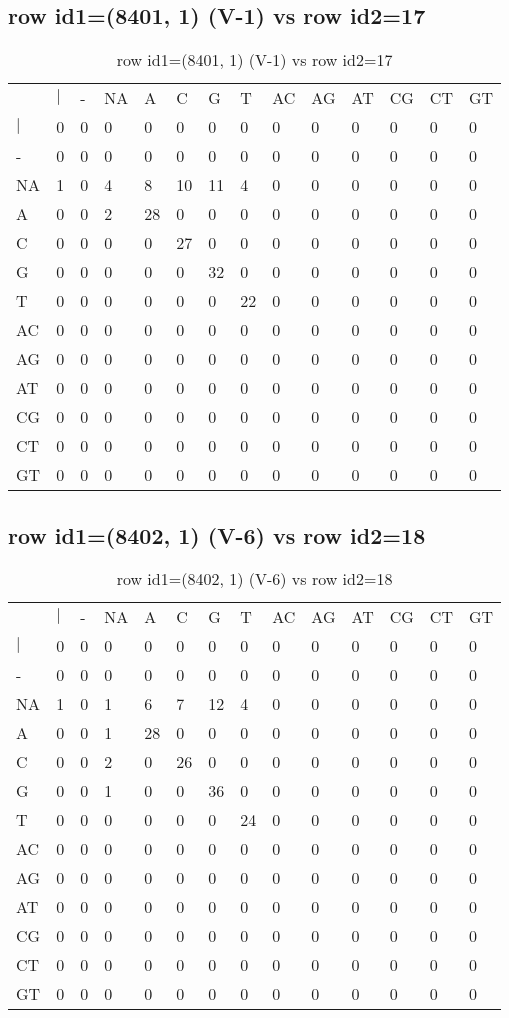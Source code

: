 \subsection{row id1=(8401, 1) (V-1) vs row id2=17}
\begin{center}
\begin{longtable}{|l|l|l|l|l|l|l|l|l|l|l|l|l|l|}
\caption{row id1=(8401, 1) (V-1) vs row id2=17} \label{table_dm470}\\
\hline
\\
\hline
&$|$&-&NA&A&C&G&T&AC&AG&AT&CG&CT&GT\\
$|$&0&0&0&0&0&0&0&0&0&0&0&0&0\\
-&0&0&0&0&0&0&0&0&0&0&0&0&0\\
NA&1&0&4&8&10&11&4&0&0&0&0&0&0\\
A&0&0&2&28&0&0&0&0&0&0&0&0&0\\
C&0&0&0&0&27&0&0&0&0&0&0&0&0\\
G&0&0&0&0&0&32&0&0&0&0&0&0&0\\
T&0&0&0&0&0&0&22&0&0&0&0&0&0\\
AC&0&0&0&0&0&0&0&0&0&0&0&0&0\\
AG&0&0&0&0&0&0&0&0&0&0&0&0&0\\
AT&0&0&0&0&0&0&0&0&0&0&0&0&0\\
CG&0&0&0&0&0&0&0&0&0&0&0&0&0\\
CT&0&0&0&0&0&0&0&0&0&0&0&0&0\\
GT&0&0&0&0&0&0&0&0&0&0&0&0&0\\
\hline
\end{longtable}
\end{center}

\subsection{row id1=(8402, 1) (V-6) vs row id2=18}
\begin{center}
\begin{longtable}{|l|l|l|l|l|l|l|l|l|l|l|l|l|l|}
\caption{row id1=(8402, 1) (V-6) vs row id2=18} \label{table_dm472}\\
\hline
\\
\hline
&$|$&-&NA&A&C&G&T&AC&AG&AT&CG&CT&GT\\
$|$&0&0&0&0&0&0&0&0&0&0&0&0&0\\
-&0&0&0&0&0&0&0&0&0&0&0&0&0\\
NA&1&0&1&6&7&12&4&0&0&0&0&0&0\\
A&0&0&1&28&0&0&0&0&0&0&0&0&0\\
C&0&0&2&0&26&0&0&0&0&0&0&0&0\\
G&0&0&1&0&0&36&0&0&0&0&0&0&0\\
T&0&0&0&0&0&0&24&0&0&0&0&0&0\\
AC&0&0&0&0&0&0&0&0&0&0&0&0&0\\
AG&0&0&0&0&0&0&0&0&0&0&0&0&0\\
AT&0&0&0&0&0&0&0&0&0&0&0&0&0\\
CG&0&0&0&0&0&0&0&0&0&0&0&0&0\\
CT&0&0&0&0&0&0&0&0&0&0&0&0&0\\
GT&0&0&0&0&0&0&0&0&0&0&0&0&0\\
\hline
\end{longtable}
\end{center}

